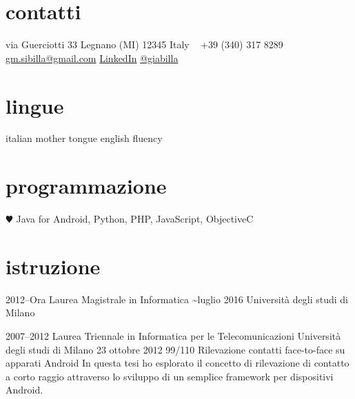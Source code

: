 \documentclass[print]{friggeri-custom} %
\begin{document}


\begin{aside} %
\section{contatti}
via Guerciotti 33
Legnano (MI) 12345
Italy
~
+39 (340) 317 8289
~
\href{mailto:gm.sibilla@gmail.com}{gm.sibilla@gmail.com}
\href{https://it.linkedin.com/in/gmbilla}{LinkedIn}
\href{https://twitter.com/giabilla}{@giabilla}
\section{lingue}
italian mother tongue
english fluency
\section{programmazione}
{\color{red} $\varheartsuit$} Java for Android, Python, PHP, JavaScript, ObjectiveC
\end{aside}


\section{istruzione}

\begin{entrylist}


\entry
{2012--Ora}
{Laurea Magistrale {\normalfont in Informatica}}
{\textasciitilde luglio 2016}
{Università degli studi di Milano}


\eduentry
{2007--2012}
{Laurea Triennale {\normalfont in Informatica per le Telecomunicazioni}}
{Università degli studi di Milano}
{23 ottobre 2012}
{99/110}
{Rilevazione contatti face-to-face su apparati Android}
{In questa tesi ho esplorato il concetto di rilevazione di contatto a corto raggio attraverso lo sviluppo di un semplice framework per dispositivi Android.}


\end{entrylist}
\end{document}

